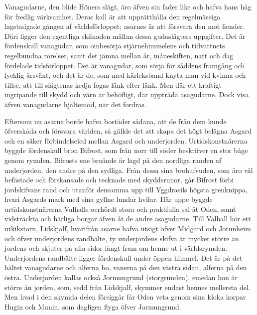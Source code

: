 Vanagudarne, den blide Höners slägt, äro äfven sin fader like och hafva
hans håg för fredlig värksamhet. Deras kall är att upprätthålla den
regelmässiga lagstadgade gången af världsförloppet; asarnes är att
försvara den mot fiender. Däri ligger den egentliga skilnaden mällan
dessa gudaslägters uppgifter. Det är fördenskull vanagudar, som
ombesörja stjärnehimmelens och tidvattnets regelbundna rörelser, samt
det jämna mellan år, måneskiften, natt och dag fördelade tidsförloppet.
Det är vanagudar, som sörja för såddens framgång och lycklig årsväxt,
och det är de, som med kärleksband knyta man vid kvinna och tillse, att
till slägtenas kedja fogas länk efter länk. Men där ett kraftigt
ingripande till skydd och värn är behöfligt, där uppträda asagudarne.
Dock visa äfven vanagudarne hjältemod, när det fordras.

Eftersom nu asarne borde hafva bostäder sådana, att de från dem kunde
öfverskåda och försvara världen, så gällde
\protect\hypertarget{lb1625905.xhtmlux5cux23start14}{}{}\protect\hypertarget{lb1625905.xhtmlux5cux23start14-a}{}{}\protect\hypertarget{lb1625905.xhtmlux5cux23start14-b}{}{}\protect\hypertarget{lb1625905.xhtmlux5cux23start14-c}{}{}\protect\hypertarget{lb1625905.xhtmlux5cux23start14-d}{}{}
det att skapa det högt belägna Asgard och en säker förbindelseled mellan
Asgard och underjorden. Urtidskonstnärerna byggde fördenskull bron
Bifrost, som från norr till söder beskrifver en stor båge genom rymden.
Bifrosts ene broände är lagd på den nordliga randen af underjorden; den
andre på den sydliga. Från dessa sina brohufvuden, som äro väl befästade
och förskansade och tecknade med skyddsrunor, går Bifrost förbi
jordskifvans rand och utanför densamma upp till Yggdrasils högsta
grenknippa, hvari Asgards mark med sina gyllne lundar hvilar. Här uppe
byggde urtidskonstnärerna Valhalls oerhördt stora och praktfulla sal åt
Oden, samt vidsträckta och härliga borgar äfven åt de andre asagudarne.
Till Valhall hör ett utkikstorn, Lidskjalf, hvarifrån asarne hafva
utsigt öfver Midgard och Jotunheim och öfver underjordens randbälte, ty
underjordens skifva är mycket större än jordens och skjuter på alla
sidor långt fram om henne ut i världsrymden. Underjordens randbälte
ligger fördenskull under öppen himmel. Det är på det bältet vanagudarne
och alferna bo, vanerna på den västra sidan, alferna på den östra.
Underjorden kallas också Jormungrund (storgrunden), emedan hon är större
än jorden, som, sedd från Lidskjalf, skymmer endast hennes mellersta
del. Men hvad i den skymda delen försiggår får Oden veta genom sina
kloka korpar Hugin och Munin, som dagligen flyga öfver Jormungrund.

